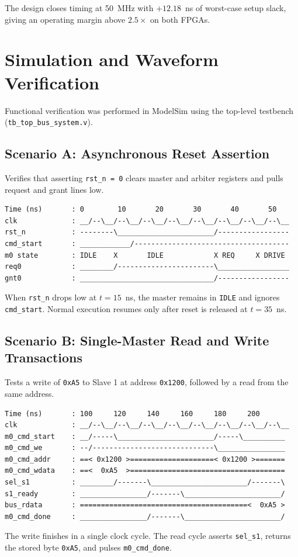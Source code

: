 \documentclass[11pt,a4paper]{article}
\begin{document}
The design closes timing at 50~MHz with $+12.18$~ns of worst-case setup slack, giving an operating margin above $2.5\times$ on both FPGAs.

\section{Simulation and Waveform Verification}

Functional verification was performed in ModelSim using the top-level testbench (\texttt{tb\_top\_bus\_system.v}).

\subsection{Scenario A: Asynchronous Reset Assertion}
Verifies that asserting \texttt{rst\_n = 0} clears master and arbiter registers and pulls request and grant lines low.
\begin{lstlisting}[numbers=none, frame=none]
Time (ns)       : 0        10       20       30       40       50
clk             : __/--\__/--\__/--\__/--\__/--\__/--\__/--\__/--\__
rst_n           : --------\_______________________/-----------------
cmd_start       : ____________/-------------------------------------
m0 state        : IDLE    X       IDLE            X REQ     X DRIVE
req0            : ________/-----------------------\_________________
gnt0            : ________________________________/-----------------
\end{lstlisting}
When \texttt{rst\_n} drops low at $t = 15$~ns, the master remains in \texttt{IDLE} and ignores \texttt{cmd\_start}. Normal execution resumes only after reset is released at $t = 35$~ns.

\subsection{Scenario B: Single-Master Read and Write Transactions}
Tests a write of \texttt{0xA5} to Slave 1 at address \texttt{0x1200}, followed by a read from the same address.
\begin{lstlisting}[numbers=none, frame=none]
Time (ns)       : 100     120     140     160     180     200
clk             : __/--\__/--\__/--\__/--\__/--\__/--\__/--\__/--\__
m0_cmd_start    : __/-----\_______________________/-----\__________
m0_cmd_we       : --/-----------------------------\________________
m0_cmd_addr     : ==< 0x1200 >====================< 0x1200 >=======
m0_cmd_wdata    : ==<  0xA5  >=====================================
sel_s1          : ________/-------\_______________________/-------\
s1_ready        : ________________/-------\_______________________/
bus_rdata       : ========================================<  0xA5 >
m0_cmd_done     : ________________/-------\_______________________/
\end{lstlisting}
The write finishes in a single clock cycle. The read cycle asserts \texttt{sel\_s1}, returns the stored byte \texttt{0xA5}, and pulses \texttt{m0\_cmd\_done}.
\end{document}
